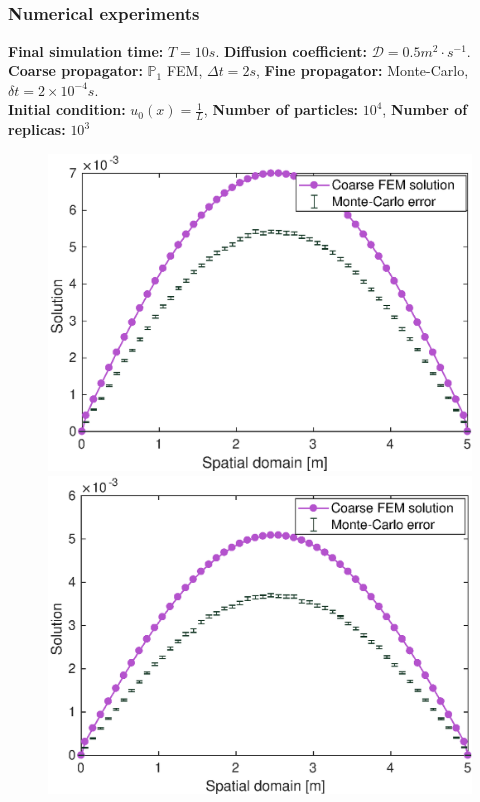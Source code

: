 \documentclass[aspectratio=169]{beamer}
\begin{document}
\subsection{}
\begin{frame}
\frametitle{Numerical experiments}
\textbf{Final simulation time:} $T=10 s$. \textbf{Diffusion coefficient:} $\mathcal{D} = 0.5 m^2 \cdot s^{-1}$.
\\
\vspace{0.2 cm}
\textbf{Coarse propagator:} $\mathbb{P}_1$ FEM, $\Delta t = 2 s$, \textbf{Fine propagator:} Monte-Carlo, $\delta t = 2 \times 10^{-4} s$.
\\
\vspace{0.2 cm}
\textbf{Initial condition:} $u_0(x)=\frac{1}{L}$, \textbf{Number of particles:} $10^4$, \textbf{Number of replicas:} $10^3$
\\
\vspace{0.1 cm}
\begin{figure}
  \centering
  \includegraphics[width= 0.43 \textwidth]{image/Full_MC_coarse_FEM_n=8}
  \quad
  \includegraphics[width= 0.43 \textwidth]{image/Full_MC_coarse_FEM_n=10}
\end{figure}
\end{frame}
%
\end{document}
